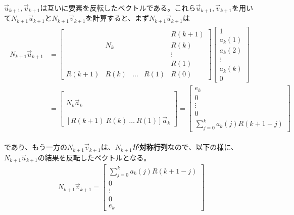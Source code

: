 \documentclass[uplatex,dvipdfmx,b5j,10pt]{jsbook}
\theoremstyle{definition}
\begin{document}
$\vec{u}_{k+1}, \vec{v}_{k+1}$は互いに要素を反転したベクトルである。これら$\vec{u}_{k+1}, \vec{v}_{k+1}$を用いて$N_{k+1}\vec{u}_{k+1}$と$N_{k+1}\vec{v}_{k+1}$を計算すると、まず$N_{k+1}\vec{u}_{k+1}$は
\begin{eqnarray*}
  \begin{split}
    N_{k+1}\vec{u}_{k+1}&=
    \left[
      \begin{array}{cccc|c}
        & & & & R(k+1)   \\
        & N_{k} & & & R(k) \\
        & & & & \vdots  \\
        & & & & R(1) \\\hline
        R(k+1) & R(k) & \dots & R(1) & R(0)
      \end{array}
    \right]
    \begin{bmatrix}
      1 \\ a_{k}(1) \\ a_{k}(2) \\ \vdots \\ a_{k}(k) \\ 0
    \end{bmatrix}\\
    &=
    \begin{bmatrix}
      \\  \\ N_{k}\vec{a}_{k} \\  \\  \\ \hline [R(k+1)\ R(k)\ \dots\ R(1)] \vec{a}_{k}
    \end{bmatrix}=
    \begin{bmatrix}
      e_{k} \\ 0 \\ \vdots \\ 0 \\  \displaystyle \sum_{j=0}^{k} a_{k}(j) R(k+1-j)
    \end{bmatrix}
  \end{split}
\end{eqnarray*}

であり、もう一方の$N_{k+1}\vec{v}_{k+1}$は、$N_{k+1}$が\textbf{対称行列}なので、以下の様に、$N_{k+1}\vec{u}_{k+1}$の結果を反転したベクトルとなる。
\begin{eqnarray*}
  N_{k+1}\vec{v}_{k+1}=
  \begin{bmatrix}
    \displaystyle \sum_{j=0}^{k} a_{k}(j) R(k+1-j) \\ 0 \\ \vdots \\ 0 \\ e_{k}
  \end{bmatrix}
\end{eqnarray*}
\end{document}
